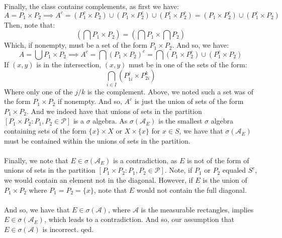 \documentclass[12pt,a4paper]{article}
\newcommand{\1}[1]{\mathbbm{1}\left\{ #1 \right\}}
\newcommand{\acal}{\mathcal{A}}
\newcommand{\pcal}{\mathcal{P}}
\begin{document}
Finally, the class contains complements, as first we have:
$$
	A = P_1 \times P_2 \implies
	A^c = \left(P_1^c \times P_2\right) \cup \left(P_1 \times P_2^c\right) \cup \left(P_1^c \times P_2^c\right) =
	\left(P_1 \times P_2^c\right) \cup \left(P_1^c \times P_2\right) 
$$
Then, note that:
$$
	\left(\bigcap P_1 \times P_2\right) =
	\left(\bigcap P_1 \times \bigcap P_2\right)
$$
Which, if nonempty, must be a set of the form $P_1 \times P_2$. And so, we have:
$$
	A = \bigcup P_1 \times P_2 \implies
	A^c = \bigcap (P_1 \times P_2)^c =
	\bigcap \left(P_1 \times P_2^c\right) \cup \left(P_1^c \times P_2\right)
$$
If $(x,y)$ is in the intersection, $(x,y)$ must be in one of the sets of the form:
$$
	\bigcap_{i \in I} (P_{1i}^j \times P_{2i}^k)
$$
Where only one of the $j/k$ is the complement. Above, we noted such a set was of the form $P_1 \times P_2$ if nonempty. And so, $A^c$ is just the union of sets of the form $P_1 \times P_2$. And we indeed have that unions of sets in the partition $[P_1 \times P_2: P_1, P_2 \in \pcal]$ is a $\sigma$ algebra. As $\sigma(\acal_E)$ is the smallest $\sigma$ algebra containing sets of the form $\{x\} \times X$ or $X \times \{x\}$ for $x \in S$, we have that $\sigma(\acal_E)$ must be contained within the unions of sets in the partition.
\\\\
Finally, we note that $E \in \sigma(\acal_E)$ is a contradiction, as $E$ is not of the form of unions of sets in the partition $[P_1 \times P_2: P_1, P_2 \in \pcal]$. Note, if $P_1$ or $P_2$ equaled $S^c$, we would contain an element not in the diagonal. However, if $E$ is the union of $P_1 \times P_2$ where $P_1 = P_2 = \{x\}$, note that $E$ would not contain the full diagonal.
\\\\
And so, we have that $E \in \sigma(\acal)$, where $\acal$ is the measurable rectangles, implies $E \in \sigma(\acal_E)$, which leads to a contradiction. And so, our assumption that $E \in \sigma(\acal)$ is incorrect. qed.
\end{document}
